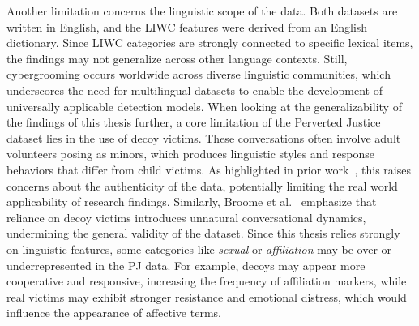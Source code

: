 Another limitation concerns the linguistic scope of the data. Both datasets are written in English, and the LIWC features were derived from an English dictionary. Since LIWC categories are strongly connected to specific lexical items, the findings may not generalize across other language contexts. Still, cybergrooming occurs worldwide across diverse linguistic communities, which underscores the need for multilingual datasets to enable the development of universally applicable detection models. 
When looking at the generalizability of the findings of this thesis further, a core limitation of the Perverted Justice dataset lies in the use of decoy victims. These conversations often involve adult volunteers posing as minors, which produces linguistic styles and response behaviors that differ from child victims. As highlighted in prior work~\cite{chiangandgrant2017online}, this raises concerns about the authenticity of the data, potentially limiting the real world applicability of research findings. Similarly, Broome et al.~\cite{broome2020psycholinguistic} emphasize that reliance on decoy victims introduces unnatural conversational dynamics, undermining the general validity of the dataset. Since this thesis relies strongly on linguistic features, some categories like \textit{sexual} or \textit{affiliation} may be over or underrepresented in the PJ data. For example, decoys may appear more cooperative and responsive, increasing the frequency of affiliation markers, while real victims may exhibit stronger resistance and emotional distress, which would influence the appearance of affective terms.  

